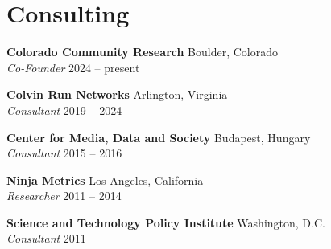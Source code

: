 \documentclass{cv}
\begin{document}
	\section{Consulting}
	\textbf{Colorado Community Research} \hfill Boulder, Colorado \\
	\textit{Co-Founder} \hfill 2024 -- present

	\textbf{Colvin Run Networks} \hfill Arlington, Virginia \\
	\textit{Consultant} \hfill 2019 -- 2024

	\textbf{Center for Media, Data and Society} \hfill Budapest, Hungary \\
	\textit{Consultant} \hfill 2015 -- 2016

	\textbf{Ninja Metrics} \hfill Los Angeles, California \\
	\textit{Researcher} \hfill 2011 -- 2014

	\textbf{Science and Technology Policy Institute} \hfill Washington, D.C. \\
	\textit{Consultant} \hfill 2011
\end{document}
